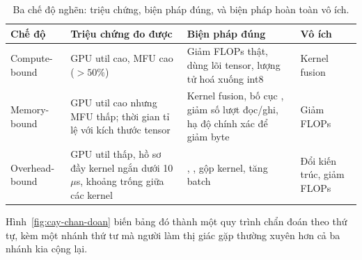 \documentclass[../../deep_learning.tex]{subfiles}
\begin{document}
\begin{table}[H]\centering\small
\caption{Ba chế độ nghẽn: triệu chứng, biện pháp đúng, và biện pháp hoàn toàn vô ích.}
\label{tab:ba-che-do}
\begin{tabularx}{\linewidth}{@{}L{2.5cm}L{3.5cm}YL{2.6cm}@{}}
\toprule
\textbf{Chế độ} & \textbf{Triệu chứng đo được} & \textbf{Biện pháp đúng} & \textbf{Vô ích}\\
\midrule
Compute-bound & GPU util cao, MFU cao (\(>50\%\)) & Giảm FLOPs thật, dùng lõi tensor, lượng tử hoá xuống int8 & Kernel fusion\\
Memory-bound & GPU util cao nhưng MFU thấp; thời gian tỉ lệ với kích thước tensor & Kernel fusion, bố cục , giảm số lượt đọc/ghi, hạ độ chính xác để giảm byte & Giảm FLOPs\\
Overhead-bound & GPU util thấp, hồ sơ đầy kernel ngắn dưới 10\,\(\mu\)s, khoảng trống giữa các kernel & , , gộp kernel, tăng batch & Đổi kiến trúc, giảm FLOPs\\
\bottomrule
\end{tabularx}
\end{table}

Hình~\ref{fig:cay-chan-doan} biến bảng đó thành một quy trình chẩn đoán theo thứ tự, kèm một nhánh thứ tư mà người làm thị giác gặp thường xuyên hơn cả ba nhánh kia cộng lại.
\end{document}
